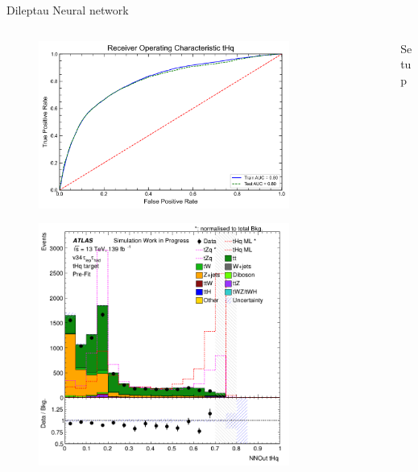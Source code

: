 \begin{frame}{Dileptau Neural network}
    \begin{columns}
        \begin{column}{0.5\textwidth}
            \begin{figure}
                \centering
                \includegraphics[width=0.8\textwidth]{lephad_ROC}    
            \end{figure}
            \vspace{-0.35cm}
            \begin{figure}
                \centering
                \includegraphics[width=0.8\textwidth]{lephad_2}    
            \end{figure}
        \end{column}
        \begin{column}{0.5\textwidth}
            \begin{block}{Setup}

\end{block}
\end{column}
\end{columns}
\end{frame}
